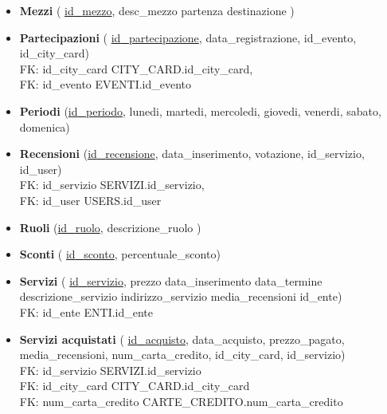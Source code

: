 \begin{itemize}
    \item 
    \textbf{Mezzi}
    (
    \underline{id{\_}mezzo},
    desc{\_}mezzo
    partenza
    destinazione
    )

    \item 
    \textbf{Partecipazioni}
    (
    \underline{id{\_}partecipazione},
    data{\_}registrazione,
    id{\_}evento,
    id{\_}city{\_}card)\\
    FK: id{\_}city{\_}card \textrightarrow CITY{\_}CARD.id{\_}city{\_}card,\\
    FK: id{\_}evento \textrightarrow EVENTI.id{\_}evento

    \item   
    \textbf{Periodi}
    (\underline{id{\_}periodo},
    lunedi,
    martedi,
    mercoledi,
    giovedi,
    venerdi,
    sabato,
    domenica)

    \item 
    \textbf{Recensioni}
    (\underline{id{\_}recensione},
    data{\_}inserimento,
    votazione,
    id{\_}servizio,
    id{\_}user)\\
    FK: id{\_}servizio \textrightarrow SERVIZI.id{\_}servizio,\\
    FK: id{\_}user \textrightarrow USERS.id{\_}user

    \item 
    \textbf{Ruoli}
    (\underline{id{\_}ruolo},
    descrizione{\_}ruolo
    )

    \item 
    \textbf{Sconti}
    (
    \underline{id{\_}sconto},
    percentuale{\_}sconto)

    \item 
    \textbf{Servizi}
    (
    \underline{id{\_}servizio},
    prezzo
    data{\_}inserimento
    data{\_}termine
    descrizione{\_}servizio
    indirizzo{\_}servizio
    media{\_}recensioni
    id{\_}ente)\\
    FK: id{\_}ente \textrightarrow ENTI.id{\_}ente
    
    \item 
    \textbf{Servizi acquistati}
    (
    \underline{id{\_}acquisto},
    data{\_}acquisto,
    prezzo{\_}pagato,
    media{\_}recensioni,
    num{\_}carta{\_}credito,
    id{\_}city{\_}card,
    id{\_}servizio)\\
    FK: id{\_}servizio \textrightarrow SERVIZI.id{\_}servizio\\
    FK: id{\_}city{\_}card \textrightarrow CITY{\_}CARD.id{\_}city{\_}card\\
    FK: num{\_}carta{\_}credito \textrightarrow CARTE{\_}CREDITO.num{\_}carta{\_}credito
    

\end{itemize}
